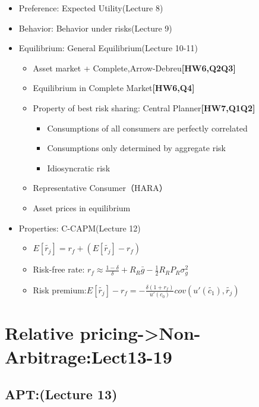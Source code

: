 \documentclass{beamer}
\begin{document}
	\begin{frame}
	\begin{itemize}
		\item Preference: Expected Utility(Lecture 8)
		\item Behavior: Behavior under risks(Lecture 9)
		\item Equilibrium: General Equilibrium(Lecture 10-11)
			\begin{itemize}
				\item Asset market + Complete,Arrow-Debreu\textbf{[HW6,Q2Q3]}
				\item Equilibrium in Complete Market\textbf{[HW6,Q4]}
			\end{itemize}
			\begin{itemize}
				\item Property of best risk sharing: Central Planner\textbf{[HW7,Q1Q2]}
					\begin{itemize}
						\item Consumptions of all consumers are perfectly correlated
						\item Consumptions only determined by aggregate risk
						\item Idiosyncratic risk 
					\end{itemize}
				\item Representative Consumer（HARA）
				\item Asset prices in equilibrium
			\end{itemize}
		\item Properties: C-CAPM(Lecture 12)
			\begin{itemize}
				\item $E[\tilde{r_j}]=r_f+(E[\tilde{r_j}]-r_f)$
				\item Risk-free rate: $r_f\approx \frac{1-\delta}{\delta}+R_R\bar{g}-\frac{1}{2}R_RP_R\sigma_g^2$
				\item Risk premium:$E[\tilde{r_j}]-r_f=-\frac{\delta(1+r_f)}{u'(c_0)}cov(u'(\tilde{c_1}),\tilde{r_j})$			\end{itemize}
	\end{itemize}
	\end{frame}
	
	\section{Relative pricing->Non-Arbitrage:Lect13-19}
  \label{sec:NA-Model}
	 \subsection{APT:(Lecture 13)}
	 
\end{document}
